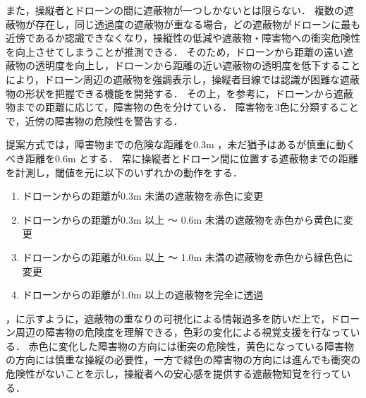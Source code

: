 \documentclass[a4paper,11pt]{ujreport}
\begin{document}
また，操縦者とドローンの間に遮蔽物が一つしかないとは限らない．
複数の遮蔽物が存在し，同じ透過度の遮蔽物が重なる場合，どの遮蔽物がドローンに最も近傍であるか認識できなくなり，操縦性の低減や遮蔽物・障害物への衝突危険性を向上させてしまうことが推測できる．
そのため，ドローンから距離の遠い遮蔽物の透明度を向上し，ドローンから距離の近い遮蔽物の透明度を低下することにより，ドローン周辺の遮蔽物を強調表示し，操縦者目線では認識が困難な遮蔽物の形状を把握できる機能を開発する．
その上，\cite{tech-01}を参考に，ドローンから遮蔽物までの距離に応じて，障害物の色を分けている．
障害物を3色に分類することで，近傍の障害物の危険性を警告する．
\par
提案方式では，障害物までの危険な距離を0.3m ，未だ猶予はあるが慎重に動くべき距離を0.6m とする．
常に操縦者とドローン間に位置する遮蔽物までの距離を計測し，閾値を元に以下のいずれかの動作をする．

\begin{enumerate}
	\item ドローンからの距離が0.3m 未満の遮蔽物を赤色に変更
    
  \item ドローンからの距離が0.3m 以上 〜 0.6m 未満の遮蔽物を赤色から黄色に変更
    
  \item ドローンからの距離が0.6m 以上 〜 1.0m 未満の遮蔽物を赤色から緑色色に変更
  
  \item ドローンからの距離が1.0m 以上の遮蔽物を完全に透過
\end{enumerate}

，に示すように，遮蔽物の重なりの可視化による情報過多を防いだ上で，ドローン周辺の障害物の危険度を理解できる，色彩の変化による視覚支援を行なっている．
赤色に変化した障害物の方向には衝突の危険性，黄色になっている障害物の方向には慎重な操縦の必要性，一方で緑色の障害物の方向には進んでも衝突の危険性がないことを示し，操縦者への安心感を提供する遮蔽物知覚を行っている．
\end{document}
